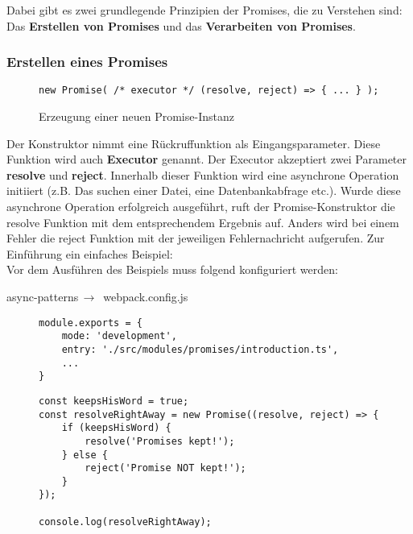 \noindent
Dabei gibt es zwei grundlegende Prinzipien der Promises, die zu Verstehen sind: Das \textbf{Erstellen von Promises} und das \textbf{Verarbeiten von Promises}.

\subsubsection{Erstellen eines Promises}

\begin{figure}[H]
\begin{lstlisting}[basicstyle=\small]
new Promise( /* executor */ (resolve, reject) => { ... } );
\end{lstlisting}
\caption{Erzeugung einer neuen Promise-Instanz}
\end{figure}

Der Konstruktor nimmt eine Rückruffunktion als Eingangsparameter. Diese Funktion wird auch \textbf{Executor} genannt.\cite{promise-executor} Der Executor akzeptiert zwei Parameter \textbf{resolve} und \textbf{reject}. Innerhalb dieser Funktion wird eine asynchrone Operation initiiert (z.B. Das suchen einer Datei, eine Datenbankabfrage etc.). Wurde diese asynchrone Operation erfolgreich ausgeführt, ruft der Promise-Konstruktor die resolve Funktion mit dem entsprechendem Ergebnis auf. Anders wird bei einem Fehler die reject Funktion mit der jeweiligen Fehlernachricht aufgerufen. Zur Einführung ein einfaches Beispiel:\\

\noindent
Vor dem Ausführen des Beispiels muss folgend konfiguriert werden:

 \begin{center}
     async-patterns$\,\to\,$ webpack.config.js
 \end{center}

\begin{figure}[H]
\begin{lstlisting}[basicstyle=\small]
module.exports = {
    mode: 'development',
    entry: './src/modules/promises/introduction.ts',
    ...
}
\end{lstlisting}
\end{figure}

\begin{figure}[H]
\begin{lstlisting}[basicstyle=\small]
const keepsHisWord = true;
const resolveRightAway = new Promise((resolve, reject) => {
    if (keepsHisWord) {
        resolve('Promises kept!');
    } else {
        reject('Promise NOT kept!');
    }
});

console.log(resolveRightAway);
\end{lstlisting}
\end{figure}

